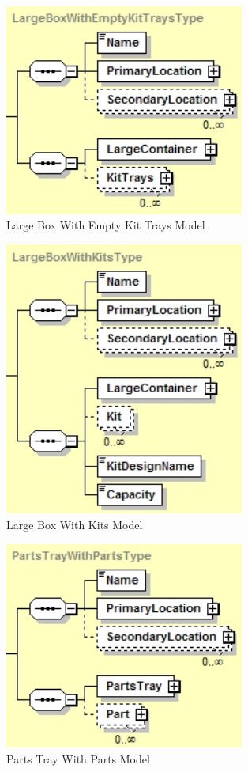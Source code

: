 \begin{figure}[htb!]
\centering
\includegraphics[width=3.1in]{images/largeBoxWithEmptyKitTrays.jpg}
\caption{Large Box With Empty Kit Trays Model}
\label{fig:LBWEKT}
\end{figure}

\begin{figure}[htb!]
\centering
\includegraphics[width=3.1in]{images/largeBoxWithKits.jpg}
\caption{Large Box With Kits Model}
\label{fig:LBWK}
\end{figure}

\begin{figure}[htb!]
\centering
\includegraphics[width=3.1in]{images/partsTrayWithParts.jpg}
\caption{Parts Tray With Parts Model}
\label{fig:PTWP}
\end{figure}

